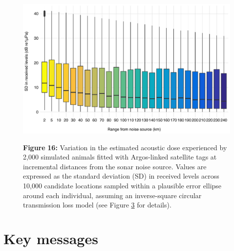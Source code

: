 \documentclass[
]{article}
\begin{document}
\begin{figure}

{\centering \includegraphics[width=0.9\linewidth]{fig/fig_argos_sd} 

}

\textbf{Figure }{\textbf{16:} \hypertarget{fig16}{}Variation in the estimated acoustic dose experienced by 2,000 simulated animals fitted with Argos-linked satellite tags at incremental distances from the sonar noise source. Values are expressed as the standard deviation (SD) in received levels across 10,000 candidate locations sampled within a plausible error ellipse around each individual, assuming an inverse-square circular transmission loss model (see Figure \hyperlink{fig3}{3} for details).}\label{fig:unnamed-chunk-15}
\end{figure}

\section{Key messages}
\end{document}
